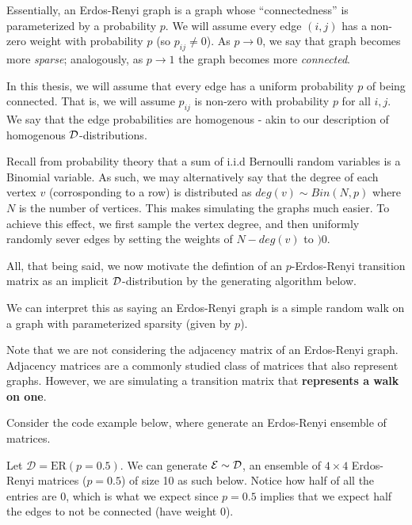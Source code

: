 Essentially, an Erdos-Renyi graph is a graph whose ``connectedness'' is parameterized by a probability $p$.
We will assume every edge $(i,j)$ has a non-zero weight with probability $p$ (so $p_{ij} \neq 0$).
As $p \to 0$, we say that graph becomes more \textit{sparse}; analogously, as $p \to 1$ the graph becomes more \textit{connected}.

\begin{remark}[Homogeneity]
In this thesis, we will assume that every edge has a uniform probability $p$ of being connected.
That is, we will assume $p_{ij}$ is non-zero with probability $p$ for all $i,j$.
We say that the edge probabilities are homogenous - akin to our description of homogenous $\mathcal{D}$-distributions.
\end{remark}

Recall from probability theory that a sum of i.i.d Bernoulli random variables is a Binomial variable.
As such, we may alternatively say that the degree of each vertex $v$ (corrosponding to a row) is distributed as $deg(v) \sim Bin(N,p)$ where $N$ is the number of vertices.
This makes simulating the graphs much easier. To achieve this effect, we first sample the vertex degree, and then uniformly randomly sever edges by setting the weights of $N - deg(v)$ to $)0$.

All, that being said, we now motivate the defintion of an $p$-Erdos-Renyi transition matrix as an implicit $\mathcal{D}$-distribution by the generating algorithm below.

\ALGerdos

We can interpret this as saying an Erdos-Renyi graph is a simple random walk on a graph with parameterized sparsity (given by $p$).

\begin{warning}
Note that we are not considering the adjacency matrix of an Erdos-Renyi graph. Adjacency matrices are a commonly studied class of matrices that also represent graphs.
However, we are simulating a transition matrix that \textbf{represents a walk on one}.
\end{warning}

Consider the code example below, where generate an Erdos-Renyi ensemble of matrices.

\begin{code}[Erdos-Renyi p = 0.5 Ensemble]
Let $\mathcal{D} = \text{ER}(p = 0.5)$. We can generate $\mathcal{E} \sim \mathcal{D}$, an ensemble of $4 \times 4$ Erdos-Renyi matrices ($p = 0.5$) of size 10 as such below.
Notice how half of all the entries are $0$, which is what we expect since $p = 0.5$ implies that we expect half the edges to not be connected (have weight 0).
\end{code}

